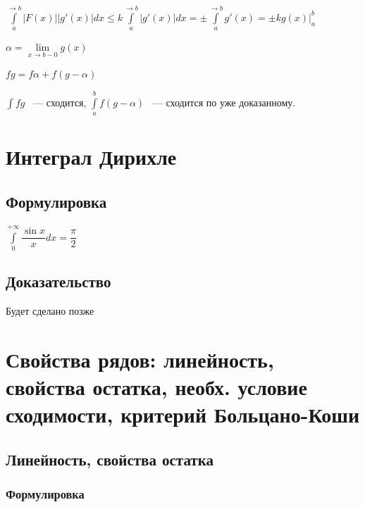 \documentclass{article}
\begin{document}
            $\int\limits^{\rightarrow b}_a \left| F(x) \right| | g'(x) | dx \leq k \int\limits^{\rightarrow b}_a | g'(x) | dx = \pm \int\limits^{\rightarrow b}_a g'(x) = \pm k g(x) \bigg|^b_a$
            
            $\alpha = \lim\limits_{x \rightarrow b- 0} g(x)$
            
            $fg = f \alpha + f(g - \alpha)$
            
            $\int fg$ ~--- сходится, $\int\limits^b_a f(g - \alpha)$ ~--- сходится по уже доказанному.
            
    \newpage
    
    \section{Интеграл Дирихле}
    
        \subsection{Формулировка}
        
            $\int\limits^{+\infty}_0 \dfrac{\sin{x}}{x} dx = \dfrac{\pi}{2}$
            
        \subsection{Доказательство}
        
            Будет сделано позже
            
    \newpage
    
    \section{Свойства рядов: линейность, свойства остатка, необх. условие сходимости, критерий Больцано-Коши}
    
        \subsection{Линейность, свойства остатка}
        
            \subsubsection{Формулировка}
            
\end{document}
